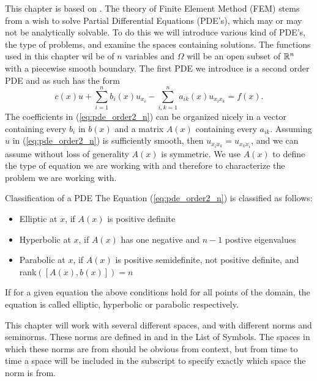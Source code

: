 This chapter is based on \cite{Braess}.
The theory of Finite Element Method (FEM) stems from a 
wish to solve Partial Differential Equations (PDE's),
which may or may not be analytically solvable. 
To do this we will introduce various kind of PDE's, 
the type of
problems, and examine the spaces containing solutions. 
The functions used in this chapter wil be of $n$ 
variables and $\Omega$ will be 
an open subset of $\mathbb{R}^n$ with a piecewise smooth boundary.
The first PDE we introduce is a second order PDE and as 
such has the form
\begin{equation}
	 c(x) u + \sum_{i=1}^{n}b_i(x)u_{x_{i}}
	- \sum_{i,k=1}^{n}a_{ik}(x)u_{x_i x_k}\label{eq:pde_order2_n}
	= f(x).
\end{equation}
The coefficients in (\ref*{eq:pde_order2_n}) can be 
organized nicely in a vector containing every $b_i$ 
in $b(x)$
and a matrix $A(x)$ containing every $a_{ik}$.
Assuming $u$ in (\ref*{eq:pde_order2_n}) is sufficiently 
smooth, then $u_{x_i x_k} =u_{x_k x_i} $, and we can 
assume without loss of generality $A(x)$ is 
symmetric. %
We use $A(x)$ to define the type of equation we are working 
with and therefore to characterize the problem we are 
working with.
\begin{defn}{Classification of a PDE}
	The Equation (\ref{eq:pde_order2_n}) is classified as follows:
	\begin{itemize}
		\item Elliptic at $x$, if $A(x)$ is positive definite
		\item Hyperbolic at $x$, if $A(x)$ has one negative and $n-1$ postive eigenvalues
		\item Parabolic at $x$, if $A(x)$ is positive semidefinite, not positive definite, and rank$([A(x), b(x)])=n$
	\end{itemize}
	If for a given equation the above conditions hold for all points of the domain, the equation is called elliptic, hyperbolic or parabolic respectively.
	\label{def:pde_classification}
\end{defn}
This chapter will work with several different spaces, and with different norms and 
seminorms. 
These norms are defined in \cite{Braess} and in the List of Symbols. 
The spaces in which these norms are from should be obvious from context, but from 
time to time a space will be included in the subscript to specify exactly which 
space the norm is from.